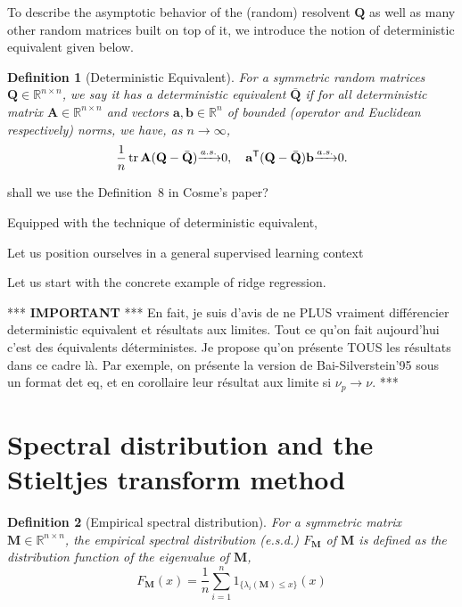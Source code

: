 \documentclass[MAL,biber]{nowfnt} %
\newcommand{\RED}{\color[rgb]{0.70,0,0}}
\newcommand{\BLUE}{\color[rgb]{0,0,0.69}}
\newtheorem{Definition}{Definition}
\newcommand{\T}{{\sf T}}
\DeclareMathOperator{\tr}{tr}
\newcommand{\asto}{{ \xrightarrow{a.s.} }}
\newcommand{\A}{{\mathbf{A}}}
\newcommand{\M}{{\mathbf{M}}}
\newcommand{\Q}{{\mathbf{Q}}}
\newcommand{\RR}{{\mathbb{R}}}
\begin{document}
To describe the asymptotic behavior of the (random) resolvent $\Q$ as well as many other random matrices built on top of it, we introduce the notion of deterministic equivalent given below.

\begin{Definition}[Deterministic Equivalent]\label{def:deterministic-equivalent}
For a symmetric random matrices $\Q \in \RR^{n \times n}$, we say it has a deterministic equivalent $\bar \Q$ if for all deterministic matrix $\A \in \RR^{n \times n}$ and vectors $\mathbf{a}, \mathbf{b} \in \RR^n$ of bounded (operator and Euclidean respectively) norms, we have, as $n \to \infty$,
\begin{equation}
    \frac1n \tr \A(\Q - \bar \Q) \asto 0, \quad \mathbf{a}^\T (\Q - \bar \Q) \mathbf{b} \asto 0.
\end{equation}
\end{Definition}
{\BLUE shall we use the Definition~8 in Cosme's paper?}

Equipped with the technique of deterministic equivalent, 

Let us position ourselves in a general supervised learning context 

Let us start with the concrete example of ridge regression. 



{\RED *** {\bf IMPORTANT} *** En fait, je suis d'avis de ne PLUS vraiment différencier deterministic equivalent et résultats aux limites. Tout ce qu'on fait aujourd'hui c'est des équivalents déterministes. Je propose qu'on présente TOUS les résultats dans ce cadre là. Par exemple, on présente la version de Bai-Silverstein'95 sous un format det eq, et en corollaire leur résultat aux limite si $\nu_p\to \nu$. ***}


\section{Spectral distribution and the Stieltjes transform method}
\label{sec:spectral-dist-and-ST}

\begin{Definition}[Empirical spectral distribution]\label{def:esd}
For a symmetric matrix $\M \in \RR^{n \times n}$, the \emph{empirical spectral distribution} (e.s.d.\@) $F_\M$ of $\M$ is defined as the distribution function of the eigenvalue of $\M$,
\[
	F_\M(x) = \frac1n \sum_{i=1}^n 1_{ \{ \lambda_i(\M) \le x\} } (x)
\]
\end{Definition}
\end{document}
